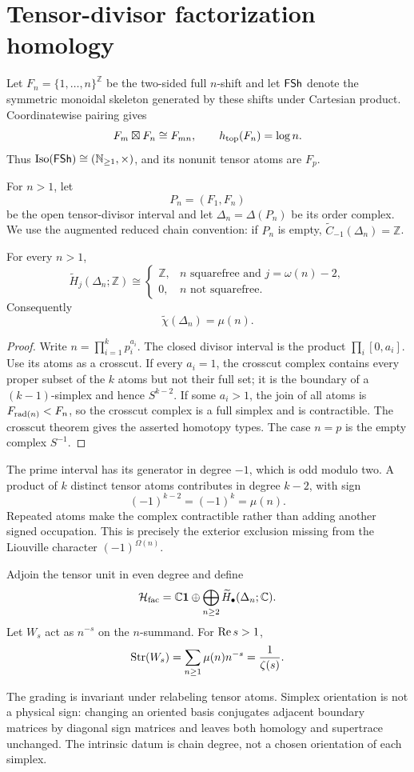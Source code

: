 \section{Tensor-divisor factorization homology}

Let $F_n=\{1,\ldots,n\}^{\mathbb Z}$ be the two-sided full $n$-shift and let
$\mathsf{FSh}$ denote the symmetric monoidal skeleton generated by these shifts
under Cartesian product. Coordinatewise pairing gives
\[
  F_m\boxtimes F_n\cong F_{mn},
  \qquad
  h_{\mathrm{top}}(F_n)=\log n.
\]
Thus $\operatorname{Iso}(\mathsf{FSh})\cong(\mathbb N_{\ge1},\times)$, and its
nonunit tensor atoms are $F_p$.

For $n>1$, let
\[
 P_n=(F_1,F_n)
\]
be the open tensor-divisor interval and let $\Delta_n=\Delta(P_n)$ be its
order complex. We use the augmented reduced chain convention: if $P_n$ is
empty, $\widetilde C_{-1}(\Delta_n)=\mathbb Z$.

\begin{theorem}
\label{thm:factorization-homology}
For every $n>1$,
\[
\widetilde H_j(\Delta_n;\mathbb Z)\cong
\begin{cases}
\mathbb Z,& n\text{ squarefree and }j=\omega(n)-2,\\
0,& n\text{ not squarefree}.
\end{cases}
\]
Consequently
\[
 \widetilde\chi(\Delta_n)=\mu(n).
\]
\end{theorem}

\begin{proof}
Write $n=\prod_{i=1}^k p_i^{a_i}$. The closed divisor interval is the
product $\prod_i[0,a_i]$. Use its atoms as a crosscut. If every $a_i=1$,
the crosscut complex contains every proper subset of the $k$ atoms but not
their full set; it is the boundary of a $(k-1)$-simplex and hence
$S^{k-2}$. If some $a_i>1$, the join of all atoms is
$F_{\operatorname{rad}(n)}<F_n$, so the crosscut complex is a full simplex and is
contractible. The crosscut theorem gives the asserted homotopy types. The
case $n=p$ is the empty complex $S^{-1}$.
\end{proof}

The prime interval has its generator in degree $-1$, which is odd modulo
two. A product of $k$ distinct tensor atoms contributes in degree $k-2$,
with sign
\[
 (-1)^{k-2}=(-1)^k=\mu(n).
\]
Repeated atoms make the complex contractible rather than adding another
signed occupation. This is precisely the exterior exclusion missing from the
Liouville character $(-1)^{\Omega(n)}$.

\begin{corollary}
\label{cor:homology-supertrace}
Adjoin the tensor unit in even degree and define
\[
\mathcal H_{\mathrm{fac}}
=\mathbb C\mathbf 1\oplus
\bigoplus_{n\ge2}\widetilde H_\bullet(\Delta_n;\mathbb C).
\]
Let $W_s$ act as $n^{-s}$ on the $n$-summand. For $\operatorname{Re} s>1$,
\[
 \operatorname{Str}(W_s)
 =\sum_{n\ge1}\mu(n)n^{-s}
 =\frac1{\zeta(s)}.
\]
\end{corollary}

The grading is invariant under relabeling tensor atoms. Simplex orientation
is not a physical sign: changing an oriented basis conjugates adjacent
boundary matrices by diagonal sign matrices and leaves both homology and
supertrace unchanged. The intrinsic datum is chain degree, not a chosen
orientation of each simplex.
